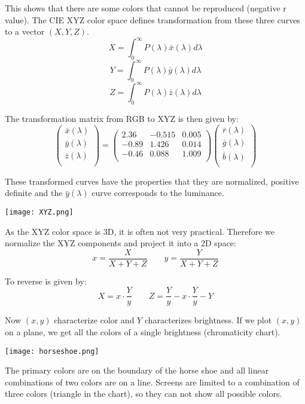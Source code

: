 This shows that there are some colors that cannot be reproduced (negative r value). The CIE XYZ color space defines transformation from these three curves to a vector $(X, Y, Z)$. 
$$X = \int_0^\infty P(\lambda) \bar x (\lambda) d\lambda$$
$$Y = \int_0^\infty P(\lambda) \bar y (\lambda) d\lambda$$
$$Z = \int_0^\infty P(\lambda) \bar z (\lambda) d\lambda$$

The transformation matrix from RGB to XYZ is then given by:
$$\begin{pmatrix}
	\bar x(\lambda) \\
	\bar y(\lambda) \\
	\bar z(\lambda) \\
\end{pmatrix}
=
\begin{pmatrix}
	2.36 & -0.515 & 0.005 \\
	-0.89 & 1.426 & 0.014 \\
	-0.46 & 0.088 & 1.009 \\
\end{pmatrix}
\begin{pmatrix}
	\bar r(\lambda) \\
	\bar g(\lambda) \\
	\bar b(\lambda) \\
\end{pmatrix}
$$

These transformed curves have the properties that they are normalized, positive definite and the $\bar y (\lambda)$ curve corresponds to the luminance.

\begin{center}
	\texttt{[image: XYZ.png]}
\end{center}

As the XYZ color space is 3D, it is often not very practical. Therefore we normalize the XYZ components and project it into a 2D space:
$$x = \frac{X}{X + Y + Z} \qquad y = \frac{Y}{X + Y + Z}$$

To reverse is given by:
$$X = x \cdot \frac{Y}{y} \qquad Z = \frac{Y}{y} - x \cdot \frac{Y}{y} - Y$$

Now $(x,y)$ characterize color and $Y$ characterizes brightness. If we plot $(x,y)$ on a plane, we get all the colors of a single brightness (chromaticity chart).
\begin{center}
	\texttt{[image: horseshoe.png]}
\end{center}
 
The primary colors are on the boundary of the horse shoe and all linear combinations of two colors are on a line. Screens are limited to a combination of three colors (triangle  in the chart), so they can not show all possible colors.\medskip

